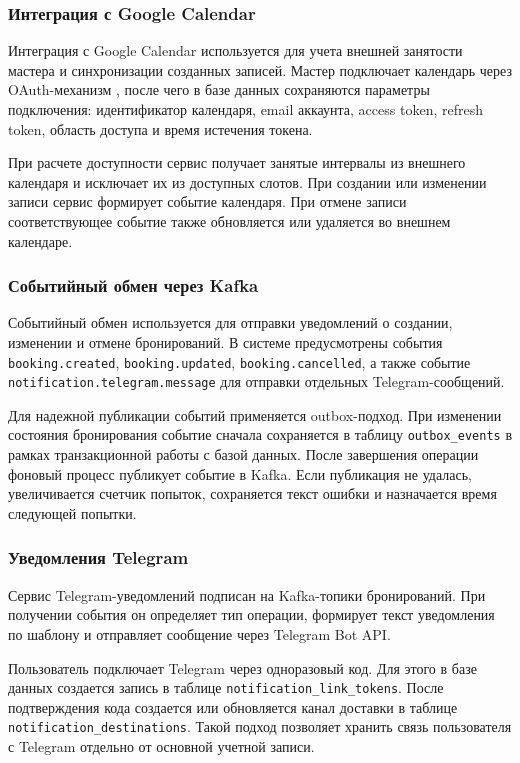 \subsubsection{Интеграция с Google Calendar}

Интеграция с Google Calendar используется для учета внешней занятости мастера и синхронизации созданных записей. Мастер подключает календарь через OAuth-механизм \cite{oauthRfc}, после чего в базе данных сохраняются параметры подключения: идентификатор календаря, email аккаунта, access token, refresh token, область доступа и время истечения токена.

При расчете доступности сервис получает занятые интервалы из внешнего календаря и исключает их из доступных слотов. При создании или изменении записи сервис формирует событие календаря. При отмене записи соответствующее событие также обновляется или удаляется во внешнем календаре.

\subsubsection{Событийный обмен через Kafka}

Событийный обмен используется для отправки уведомлений о создании, изменении и отмене бронирований. В системе предусмотрены события \texttt{booking.created}, \texttt{booking.updated}, \texttt{booking.cancelled}, а также событие \texttt{notification.telegram.message} для отправки отдельных Telegram-сообщений.

Для надежной публикации событий применяется outbox-подход. При изменении состояния бронирования событие сначала сохраняется в таблицу \texttt{outbox\_events} в рамках транзакционной работы с базой данных. После завершения операции фоновый процесс публикует событие в Kafka. Если публикация не удалась, увеличивается счетчик попыток, сохраняется текст ошибки и назначается время следующей попытки.

\subsubsection{Уведомления Telegram}

Сервис Telegram-уведомлений подписан на Kafka-топики бронирований. При получении события он определяет тип операции, формирует текст уведомления по шаблону и отправляет сообщение через Telegram Bot API.

Пользователь подключает Telegram через одноразовый код. Для этого в базе данных создается запись в таблице \texttt{notification\_link\_tokens}. После подтверждения кода создается или обновляется канал доставки в таблице \texttt{notification\_destinations}. Такой подход позволяет хранить связь пользователя с Telegram отдельно от основной учетной записи.

